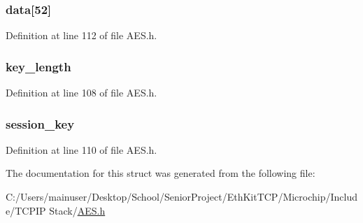 \subsubsection[{data}]{ data\mbox{[}52\mbox{]}}\label{struct_a_e_s___r_o_u_n_d___k_e_y_s__192___b_i_t_a948c3205fda0946d9a990ba087ecbb9d}


Definition at line 112 of file A\+E\+S.\+h.

\hypertarget{struct_a_e_s___r_o_u_n_d___k_e_y_s__192___b_i_t_aa42d871fcd1183159392e19781181b56}{}
\subsubsection[{key\+\_\+length}]{ key\+\_\+length}\label{struct_a_e_s___r_o_u_n_d___k_e_y_s__192___b_i_t_aa42d871fcd1183159392e19781181b56}


Definition at line 108 of file A\+E\+S.\+h.

\hypertarget{struct_a_e_s___r_o_u_n_d___k_e_y_s__192___b_i_t_a8188e88d5ecaef25564a4afaaf888573}{}
\subsubsection[{session\+\_\+key}]{ session\+\_\+key}\label{struct_a_e_s___r_o_u_n_d___k_e_y_s__192___b_i_t_a8188e88d5ecaef25564a4afaaf888573}


Definition at line 110 of file A\+E\+S.\+h.



The documentation for this struct was generated from the following file\+:\begin{DoxyCompactItemize}
\item 
C\+:/\+Users/mainuser/\+Desktop/\+School/\+Senior\+Project/\+Eth\+Kit\+T\+C\+P/\+Microchip/\+Include/\+T\+C\+P\+I\+P Stack/\hyperlink{_a_e_s_8h}{A\+E\+S.\+h}\end{DoxyCompactItemize}
